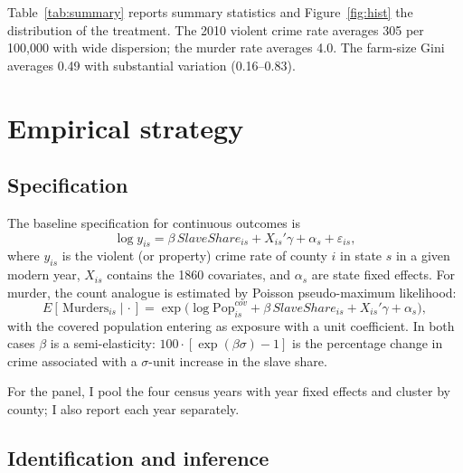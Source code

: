 \documentclass[12pt]{article}
\begin{document}
Table~\ref{tab:summary} reports summary statistics and Figure~\ref{fig:hist} the distribution of the treatment. The 2010 violent crime rate averages 305 per 100,000 with wide dispersion; the murder rate averages 4.0. The farm-size Gini averages 0.49 with substantial variation (0.16--0.83).

\section{Empirical strategy}\label{sec:strategy}

\subsection{Specification}

The baseline specification for continuous outcomes is
\begin{equation}\label{eq:ols}
\log y_{is} = \beta \, SlaveShare_{is} + X_{is}'\gamma + \alpha_s + \varepsilon_{is},
\end{equation}
where $y_{is}$ is the violent (or property) crime rate of county $i$ in state $s$ in a given modern year, $X_{is}$ contains the 1860 covariates, and $\alpha_s$ are state fixed effects. For murder, the count analogue is estimated by Poisson pseudo-maximum likelihood:
\begin{equation}\label{eq:ppml}
E[\,\text{Murders}_{is} \mid \cdot\,] = \exp\!\big(\log \text{Pop}^{cov}_{is} + \beta \, SlaveShare_{is} + X_{is}'\gamma + \alpha_s\big),
\end{equation}
with the covered population entering as exposure with a unit coefficient. In both cases $\beta$ is a semi-elasticity: $100 \cdot [\exp(\beta \sigma) - 1]$ is the percentage change in crime associated with a $\sigma$-unit increase in the slave share.

For the panel, I pool the four census years with year fixed effects and cluster by county; I also report each year separately.

\subsection{Identification and inference}
\end{document}
